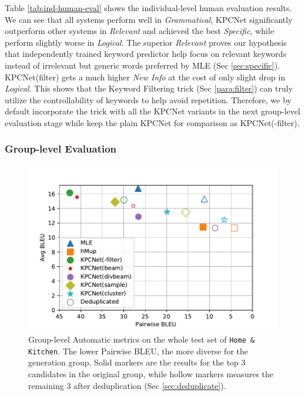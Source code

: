 Table \ref{tab:ind-human-eval} shows the individual-level human evaluation results. We can see that all systems perform well in \textit{Grammatical}, KPCNet significantly outperform other systems in \textit{Relevant} and achieved the best \textit{Specific}, while perform slightly worse in \textit{Logical}. The superior \textit{Relevant} proves our hypothesis that independently trained keyword predictor help focus on relevant keywords instead of irrelevant but generic words preferred by MLE (Sec \ref{sec:specific}). KPCNet(filter) gets a much higher \textit{New Info} at the cost of only slight drop in \textit{Logical}. This shows that the Keyword Filtering trick (Sec \ref{para:filter}) can truly utilize the controllability of keywords to help avoid repetition. Therefore, we by default incorporate the trick with all the KPCNet variants in the next group-level evaluation stage while keep the plain KPCNet for comparison as KPCNet(-filter).

\subsubsection{Group-level Evaluation}

  \begin{figure}[htbp]
    \centering
    \includegraphics[width=\linewidth]{tradeoff-2BLEU.pdf}
    \caption{Group-level Automatic metrics on the whole test set of \texttt{Home \& Kitchen}. The lower Pairwise BLEU, the more diverse for the generation group. Solid markers are the results for the top 3 candidates in the original group, while hollow markers measures the remaining 3 after deduplication (Sec \ref{sec:deduplicate}).}
    \label{fig:group-filter}
    \end{figure}


